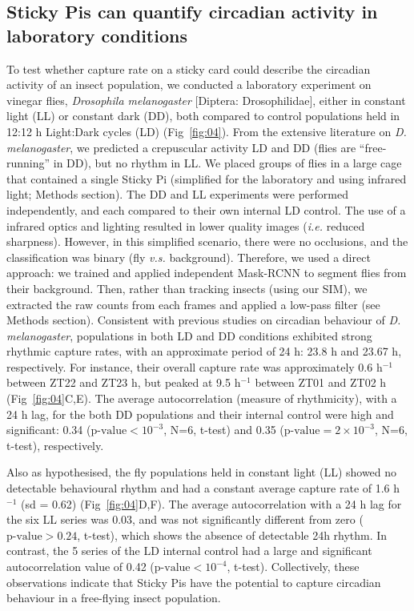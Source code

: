 \documentclass[12pt]{article}
\begin{document}
\begin{linenumbers}
		\subsection*{Sticky Pis can quantify circadian activity in laboratory conditions}
		To test whether capture rate on a sticky card could describe the circadian activity of an insect population, we conducted a laboratory experiment on vinegar flies, \emph{Drosophila melanogaster} [Diptera: Drosophilidae], either in constant light (LL) or constant dark (DD), both compared to control populations held in 12:12 h Light:Dark cycles (LD) (Fig~\ref{fig:04}). From the extensive literature on \emph{D. melanogaster}, we predicted a crepuscular activity LD and DD (flies are “free-running” in DD), but no rhythm in LL\cite{tataroglu_studying_2014}. We placed groups of flies in a large cage that contained a single Sticky Pi (simplified for the laboratory and using infrared light; Methods section).
		The DD and LL experiments were performed independently, and each compared to their own internal LD control.
        The use of a infrared optics and lighting resulted in lower quality images (\emph{i.e.} reduced sharpness).
        However, in this simplified scenario, there were no occlusions, and the classification was binary (fly \emph{v.s.} background).
        Therefore, we used a direct approach: we trained and applied independent Mask-RCNN to segment flies from their background. 
        Then, rather than tracking insects (using our SIM), we extracted the raw counts from each frames and applied a low-pass filter (see Methods section).
		Consistent with previous studies on circadian behaviour of \emph{D. melanogaster}, populations in both LD and DD conditions exhibited strong rhythmic capture rates, with an approximate period of 24 h: 23.8 h and 23.67 h, respectively. For instance, their overall capture rate was approximately 0.6 h$^{-1}$ between ZT22 and ZT23 h, but peaked at 9.5 h$^{-1}$ between ZT01 and ZT02 h (Fig~\ref{fig:04}C,E). 
		The average autocorrelation (measure of rhythmicity), with a 24 h lag, for the both DD populations and their internal control were high and significant: 0.34 ($\text{p-value} < 10^{-3}$, N=6, t-test) and 0.35 ($\text{p-value} = 2 \times{} 10^{-3}$, N=6, t-test), respectively. 
		
		Also as hypothesised, the fly populations held in constant light (LL) showed no detectable behavioural rhythm and had a constant average capture rate of 1.6 h$^{-1}$ (sd = 0.62) (Fig~\ref{fig:04}D,F).
		The average autocorrelation with a 24 h lag for the six LL series was 0.03, and was not significantly different from zero ($\text{p-value} > 0.24$,  t-test), which shows the absence of detectable 24h rhythm.
		In contrast, the 5 series of the LD internal control had a large and significant autocorrelation value of 0.42 ($\text{p-value} < 10^{-4}$, t-test).
		Collectively, these observations indicate that Sticky Pis have the potential to capture circadian behaviour in a free-flying insect population.
		

\end{linenumbers}
\end{document}
